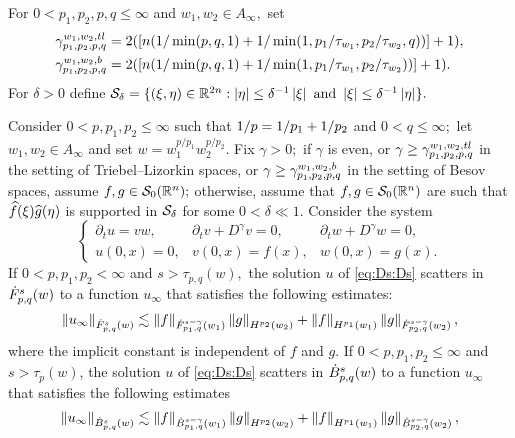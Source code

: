   

For $0<p_1,p_2, p, q\le \infty$ and $w_1,w_2\in A_\infty,$ set
\begin{align*}
\gamt&=2( [n(1/\min(p,q,1)+1/\min(1,p_1/\tau_{w_1},p_2/\tau_{w_2},q))]+1),\\
 \gamb&=2( [n(1/\min(p,q,1)+1/\min(1,p_1/\tau_{w_1},p_2/\tau_{w_2}))]+1).
\end{align*}
For $\delta>0$ define
$
\Ss_{\delta}=\{(\xi,\eta)\in \re^{2n}: \abs{\eta}\le \delta^{-1}\abs{\xi}\text{ and }\abs{\xi}\le \delta^{-1}\abs{\eta}\}.
$

 
 \begin{theorem}\label{thm:scattering} Consider  $0 < p, p_1, p_2  \le \infty$  such that $\hcline$ and  $0 < q \leq \infty;$ let  $w_1,w_2\in A_\infty$ and set $w=w_1^{{p}/{p_1}} w_2^{{p}/{p_2}}.$ 
Fix $\gamma>0;$ if $\gamma$ is even, or $\gamma\ge \gamt$ in the setting of Triebel--Lizorkin spaces, or $\gamma\ge \gamb$ in the setting of Besov spaces, assume $f, g \in \swz;$ otherwise, assume that $f,g\in\swz$ are such that $\fhat(\xi)\ghat(\eta)$ is supported in $\Ss_{\delta}$ for some $0<\delta\ll1.$ Consider the system 
\begin{equation}\label{eq:Ds:Ds}
\left\{ \begin{array}{lll}  \partial_t u =vw, & \partial_t v +D^\gamma v = 0, & \partial_t w + D^\gamma w = 0, \\
  u(0,x)=0,&v(0,x)=f(x),&w(0,x) = g(x).
 \end{array} \right.
\end{equation}
\noindent If $0 < p,p_1,p_2 < \infty$ and  $s > \tau_{p,q}(w),$ the solution $u$ of \eqref{eq:Ds:Ds}  scatters in $\tlw{p}{s}{q}{w}$ to a function $u_\infty$ that satisfies the following estimates: 
\begin{equation}\label{eq:scattering1}
\norm{u_\infty}{\tlw{p}{s}{q}{w}} \lesssim \norm{f}{\tlw{p_1}{s-\gamma}{q}{w_1} } \norm{g}{H^{p_2}(w_2)} +  \norm{f}{H^{p_1}(w_1)}   \norm{g}{\tlw{p_2}{s-\gamma}{q}{w_2} },
\end{equation}
where the implicit constant is independent of $f$ and $g.$
If $0< p, p_1,p_2\leq \infty$ and $s > \tau_p(w)$, the solution $u$ of \eqref{eq:Ds:Ds}  scatters in $\besw{p}{s}{q}{w}$ to a function $u_\infty$ that satisfies the following estimates
\begin{equation}\label{eq:scattering2}
\norm{u_\infty}{\besw{p}{s}{q}{w}} \lesssim \norm{f}{\besw{p_1}{s-\gamma}{q}{w_1} } \norm{g}{H^{p_2}(w_2)} +  \norm{f}{H^{p_1}(w_1)}   \norm{g}{\besw{p_2}{s-\gamma}{q}{w_2} },
\end{equation}

\end{theorem}
